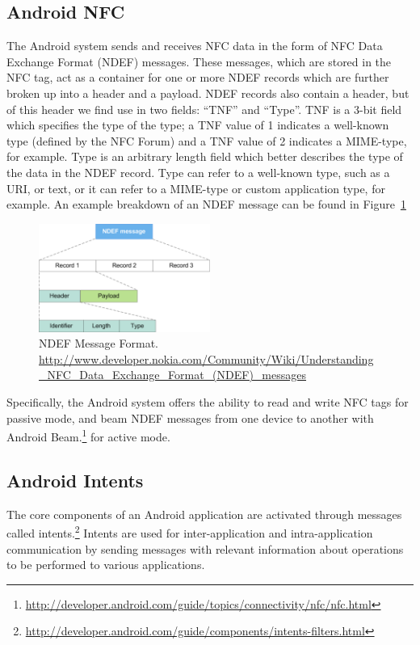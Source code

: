 \documentclass[12pt]{article}
\begin{document}
\subsection{Android NFC}
The Android system sends and receives NFC data in the form of NFC Data Exchange Format (NDEF) messages.
These messages, which are stored in the NFC tag, act as a container for one or more NDEF records which are further broken up into a header and a payload.
NDEF records also contain a header, but of this header we find use in two fields: ``TNF'' and ``Type''.
TNF is a 3-bit field which specifies the type of the type; a TNF value of 1 indicates a well-known type (defined by the NFC Forum) and a TNF value of 2 indicates a MIME-type, for example.
Type is an arbitrary length field which better describes the type of the data in the NDEF record.
Type can refer to a well-known type, such as a URI, or text, or it can refer to a MIME-type or custom application type, for example.
An example breakdown of an NDEF message can be found in Figure~\ref{fig:background:ndef}

\begin{figure}[h!]
	\centering
		\includegraphics[width=0.5\textwidth]{NDEF_Format.png}
	\caption[Caption for LOF]%
		{NDEF Message Format. \\{\scriptsize\url{http://www.developer.nokia.com/Community/Wiki/Understanding_NFC_Data_Exchange_Format_(NDEF)_messages}}}
  \label{fig:background:ndef}

\end{figure}

Specifically, the Android system offers the ability to read and write NFC tags for passive mode, and beam NDEF messages from one device to another with Android Beam.\footnote{\url{http://developer.android.com/guide/topics/connectivity/nfc/nfc.html}} for active mode. 

\subsection{Android Intents}
The core components of an Android application are activated through messages called intents.\footnote{\url{http://developer.android.com/guide/components/intents-filters.html}}
Intents are used for inter-application and intra-application communication by sending messages with relevant information about operations to be performed to various applications.  
\end{document}
